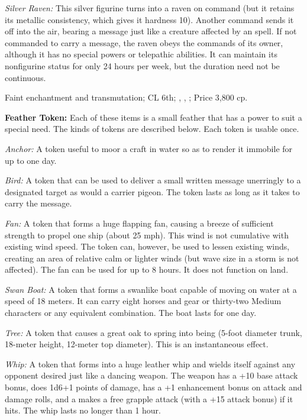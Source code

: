 \textit{Silver Raven:} This silver figurine turns into a raven on command (but it retains its metallic consistency, which gives it hardness 10). Another command sends it off into the air, bearing a message just like a creature affected by an  spell. If not commanded to carry a message, the raven obeys the commands of its owner, although it has no special powers or telepathic abilities. It can maintain its nonfigurine status for only 24 hours per week, but the duration need not be continuous.

Faint enchantment and transmutation; CL 6th; , , ; Price 3,800 cp.



\textbf{Feather Token:} Each of these items is a small feather that has a power to suit a special need. The kinds of tokens are described below. Each token is usable once.

\begin{itemize*}
\item \textit{Anchor:} A token useful to moor a craft in water so as to render it immobile for up to one day.
\item \textit{Bird:} A token that can be used to deliver a small written message unerringly to a designated target as would a carrier pigeon. The token lasts as long as it takes to carry the message.
\item \textit{Fan:} A token that forms a huge flapping fan, causing a breeze of sufficient strength to propel one ship (about 25 mph). This wind is not cumulative with existing wind speed. The token can, however, be used to lessen existing winds, creating an area of relative calm or lighter winds (but wave size in a storm is not affected). The fan can be used for up to 8 hours. It does not function on land.
\item \textit{Swan Boat:} A token that forms a swanlike boat capable of moving on water at a speed of 18 meters. It can carry eight horses and gear or thirty-two Medium characters or any equivalent combination. The boat lasts for one day.
\item \textit{Tree:} A token that causes a great oak to spring into being (5-foot diameter trunk, 18-meter height, 12-meter top diameter). This is an instantaneous effect.
\item \textit{Whip:} A token that forms into a huge leather whip and wields itself against any opponent desired just like a dancing weapon. The weapon has a +10 base attack bonus, does 1d6+1 points of damage, has a +1 enhancement bonus on attack and damage rolls, and a makes a free grapple attack (with a +15 attack bonus) if it hits. The whip lasts no longer than 1 hour.
\end{itemize*}

